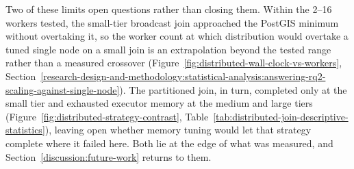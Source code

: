 Two of these limits open questions rather than closing them. Within the \numrange{2}{16} workers tested, the small-tier broadcast join approached the PostGIS minimum without overtaking it, so the worker count at which distribution would overtake a tuned single node on a small join is an extrapolation beyond the tested range rather than a measured crossover (Figure~\ref{fig:distributed-wall-clock-vs-workers}, Section~\ref{research-design-and-methodology:statistical-analysis:answering-rq2-scaling-against-single-node}). The partitioned join, in turn, completed only at the small tier and exhausted executor memory at the medium and large tiers (Figure~\ref{fig:distributed-strategy-contrast}, Table~\ref{tab:distributed-join-descriptive-statistics}), leaving open whether memory tuning would let that strategy complete where it failed here. Both lie at the edge of what was measured, and Section~\ref{discussion:future-work} returns to them.